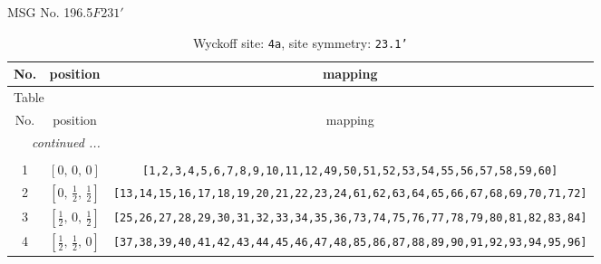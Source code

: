 \documentclass[fleqn,8pt]{jsarticle}
\begin{document}
\setcounter{MaxMatrixCols}{32}

\renewcommand{\tablename}{Table~}
\renewcommand{\figurename}{Figure~}
\begin{center}
\LARGE
MSG No. 196.5\quad$F231'$
\end{center}
\renewcommand{\arraystretch}{1.2}
\begin{longtable}{ccc}
\caption{Wyckoff site: {\tt 4a}, site symmetry: {\tt 23.1'}}
 \\
 \hline \hline
No. & position & mapping \\ \hline \endfirsthead

\multicolumn{2}{l}{\tablename\ \thetable{}} \\
 \hline \hline
No. & position & mapping \\ \hline \endhead

 \hline \hline
\multicolumn{2}{r}{\footnotesize\it continued ...} \\ \endfoot

 \hline \hline
\multicolumn{2}{r}{} \\ \endlastfoot

1 & $\left[ 0,\, 0,\, 0 \right]$ & {\tt [1,2,3,4,5,6,7,8,9,10,11,12,49,50,51,52,53,54,55,56,57,58,59,60]} \\ \hline
2 & $\left[ 0,\, \frac{1}{2},\, \frac{1}{2} \right]$ & {\tt [13,14,15,16,17,18,19,20,21,22,23,24,61,62,63,64,65,66,67,68,69,70,71,72]} \\ \hline
3 & $\left[ \frac{1}{2},\, 0,\, \frac{1}{2} \right]$ & {\tt [25,26,27,28,29,30,31,32,33,34,35,36,73,74,75,76,77,78,79,80,81,82,83,84]} \\ \hline
4 & $\left[ \frac{1}{2},\, \frac{1}{2},\, 0 \right]$ & {\tt [37,38,39,40,41,42,43,44,45,46,47,48,85,86,87,88,89,90,91,92,93,94,95,96]} \\
\end{longtable}
\renewcommand{\arraystretch}{1.2}
\end{document}
